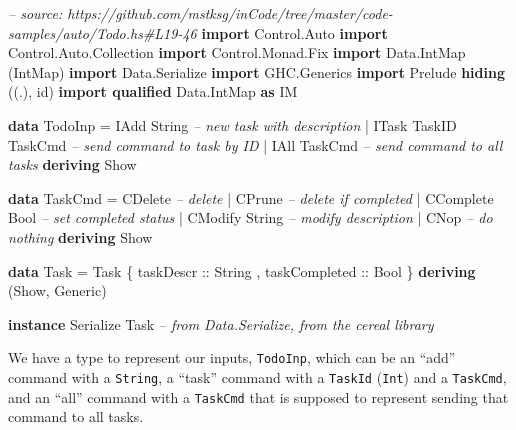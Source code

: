\documentclass[]{article}
\newenvironment{Shaded}{}{}
\newcommand{\KeywordTok}[1]{\textcolor[rgb]{0.00,0.44,0.13}{\textbf{{#1}}}}
\newcommand{\DataTypeTok}[1]{\textcolor[rgb]{0.56,0.13,0.00}{{#1}}}
\newcommand{\CommentTok}[1]{\textcolor[rgb]{0.38,0.63,0.69}{\textit{{#1}}}}
\newcommand{\OtherTok}[1]{\textcolor[rgb]{0.00,0.44,0.13}{{#1}}}
\newcommand{\FunctionTok}[1]{\textcolor[rgb]{0.02,0.16,0.49}{{#1}}}
\newcommand{\NormalTok}[1]{{#1}}
\begin{document}
\begin{Shaded}
\begin{Highlighting}[]
\CommentTok{-- source: https://github.com/mstksg/inCode/tree/master/code-samples/auto/Todo.hs#L19-46}
\KeywordTok{import }\DataTypeTok{Control.Auto}
\KeywordTok{import }\DataTypeTok{Control.Auto.Collection}
\KeywordTok{import }\DataTypeTok{Control.Monad.Fix}
\KeywordTok{import }\DataTypeTok{Data.IntMap}             \NormalTok{(}\DataTypeTok{IntMap}\NormalTok{)}
\KeywordTok{import }\DataTypeTok{Data.Serialize}
\KeywordTok{import }\DataTypeTok{GHC.Generics}
\KeywordTok{import }\DataTypeTok{Prelude} \KeywordTok{hiding}          \NormalTok{((.), id)}
\KeywordTok{import qualified} \DataTypeTok{Data.IntMap}   \KeywordTok{as} \DataTypeTok{IM}

\KeywordTok{data} \DataTypeTok{TodoInp} \FunctionTok{=} \DataTypeTok{IAdd}  \DataTypeTok{String}           \CommentTok{-- new task with description}
             \FunctionTok{|} \DataTypeTok{ITask} \DataTypeTok{TaskID} \DataTypeTok{TaskCmd}   \CommentTok{-- send command to task by ID}
             \FunctionTok{|} \DataTypeTok{IAll} \DataTypeTok{TaskCmd}           \CommentTok{-- send command to all tasks}
             \KeywordTok{deriving} \DataTypeTok{Show}

\KeywordTok{data} \DataTypeTok{TaskCmd} \FunctionTok{=} \DataTypeTok{CDelete}          \CommentTok{-- delete}
             \FunctionTok{|} \DataTypeTok{CPrune}           \CommentTok{-- delete if completed}
             \FunctionTok{|} \DataTypeTok{CComplete} \DataTypeTok{Bool}   \CommentTok{-- set completed status}
             \FunctionTok{|} \DataTypeTok{CModify} \DataTypeTok{String}   \CommentTok{-- modify description}
             \FunctionTok{|} \DataTypeTok{CNop}             \CommentTok{-- do nothing}
             \KeywordTok{deriving} \DataTypeTok{Show}

\KeywordTok{data} \DataTypeTok{Task} \FunctionTok{=} \DataTypeTok{Task} \NormalTok{\{}\OtherTok{ taskDescr     ::} \DataTypeTok{String}
                 \NormalTok{,}\OtherTok{ taskCompleted ::} \DataTypeTok{Bool}
                 \NormalTok{\} }\KeywordTok{deriving} \NormalTok{(}\DataTypeTok{Show}\NormalTok{, }\DataTypeTok{Generic}\NormalTok{)}

\KeywordTok{instance} \DataTypeTok{Serialize} \DataTypeTok{Task} \CommentTok{-- from Data.Serialize, from the cereal library}
\end{Highlighting}
\end{Shaded}

We have a type to represent our inputs, \texttt{TodoInp}, which can be
an ``add'' command with a \texttt{String}, a ``task'' command with a
\texttt{TaskId} (\texttt{Int}) and a \texttt{TaskCmd}, and an ``all''
command with a \texttt{TaskCmd} that is supposed to represent sending
that command to all tasks.
\end{document}
